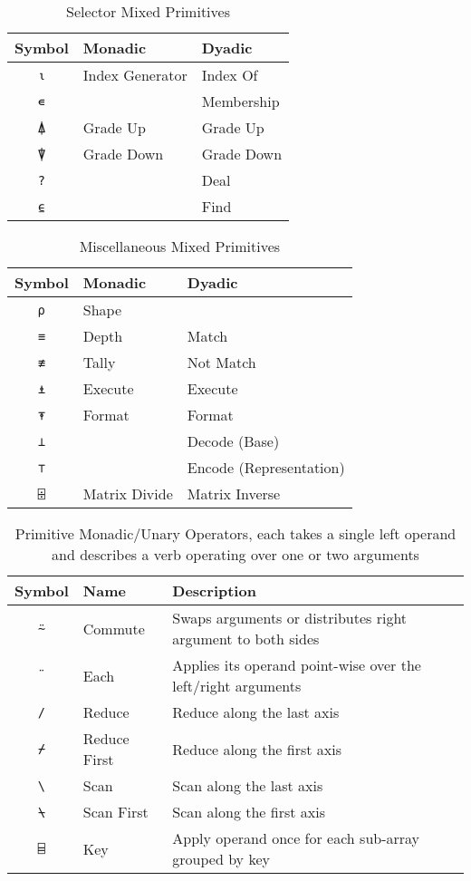 \documentclass[numbers,preprint]{sigplanconf}
\begin{document}
\begin{table}
\centering
\begin{tabular}{cll}
\toprule
Symbol     & Monadic         & Dyadic \\
\midrule
\texttt{⍳} & Index Generator & Index Of \\
\texttt{∊} &                 & Membership \\
\texttt{⍋} & Grade Up        & Grade Up \\
\texttt{⍒} & Grade Down      & Grade Down \\
\texttt{?} &                 & Deal \\
\texttt{⍷} &                 & Find \\
\end{tabular}
\caption{Selector Mixed Primitives}
\label{tab:seltorprims}
\end{table}

\begin{table}
\centering
\begin{tabular}{cll}
\toprule
Symbol     & Monadic       & Dyadic \\
\midrule
\texttt{⍴} & Shape         & \\
\texttt{≡} & Depth         & Match \\
\texttt{≢} & Tally         & Not Match \\
\texttt{⍎} & Execute       & Execute \\
\texttt{⍕} & Format        & Format \\
\texttt{⊥} &               & Decode (Base) \\
\texttt{⊤} &               & Encode (Representation) \\
\texttt{⌹} & Matrix Divide & Matrix Inverse \\
\end{tabular}
\caption{Miscellaneous Mixed Primitives}
\label{tab:miscprims}
\end{table}

\begin{table*}
\centering
\begin{tabular}{cll}
\toprule
Symbol     & Name & Description \\
\midrule
\texttt{⍨} & Commute & Swaps arguments or distributes
 right argument to both sides \\
\texttt{¨} & Each & Applies its operand point-wise over the left/right
 arguments \\
\texttt{/} & Reduce & Reduce along the last axis \\
\texttt{⌿} & Reduce First & Reduce along the first axis \\
\texttt{\textbackslash} & Scan & Scan along the last axis \\
\texttt{⍀} & Scan First & Scan along the first axis \\
\texttt{⌸} & Key & Apply operand once for each sub-array grouped by key \\
\end{tabular}
\caption{Primitive Monadic/Unary Operators, each takes a single left
operand and describes a verb operating over one or two arguments}
\label{tab:adverbs}
\end{table*}
\end{document}
